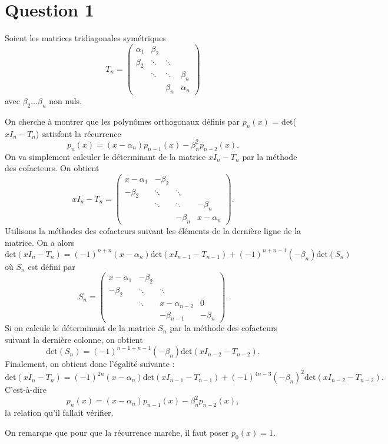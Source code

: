 \section*{Question 1}
Soient les matrices tridiagonales symétriques
$$T_n =
\begin{pmatrix}
\alpha_1 & \beta_2 & & \\
\beta_2 & \ddots & \ddots & \\
 & \ddots & \ddots & \beta_n \\
 & & \beta_n & \alpha_n
\end{pmatrix}
$$
avec $\beta_2 \hdots \beta_n$ non nuls.

On cherche à montrer que les polynômes orthogonaux définis par $p_n(x)$ = det($x I_n - T_n$) satisfont la récurrence $$p_n(x) = (x-\alpha_n)p_{n-1}(x) - \beta_n^2 p_{n-2}(x).$$
On va simplement calculer le déterminant de la matrice $x I_n - T_n$ par la méthode des cofacteurs. On obtient
$$x I_n - T_n =
\begin{pmatrix}
x-\alpha_1 & -\beta_2 & & \\
-\beta_2 & \ddots & \ddots & \\
 & \ddots & \ddots & -\beta_n \\
 & & -\beta_n & x-\alpha_n
\end{pmatrix}.
$$
Utilisons la méthodes des cofacteurs suivant les éléments de la dernière ligne de la matrice. On a alors $$\text{det}(x I_n - T_n) = (-1)^{n+n}(x-\alpha_n)\text{det}(x I_{n-1} - T_{n-1}) + (-1)^{n+n-1}(-\beta_n)\text{det}(S_n)$$ où $S_n$ est défini par
$$S_n =
\begin{pmatrix}
x-\alpha_1 & -\beta_2 & & \\
-\beta_2 & \ddots & \ddots & \\
 & \ddots & x-\alpha_{n-2} & 0 \\
 & & -\beta_{n-1} & -\beta_n
\end{pmatrix}.
$$
Si on calcule le déterminant de la matrice $S_n$ par la méthode des cofacteurs suivant la dernière colonne, on obtient $$\text{det}(S_n) = (-1)^{n-1+n-1}(-\beta_n)\text{det}(x I_{n-2} - T_{n-2}).$$
Finalement, on obtient donc l'égalité suivante : $$\text{det}(x I_n - T_n) = (-1)^{2n}(x-\alpha_n)\text{det}(x I_{n-1} - T_{n-1}) + (-1)^{4n-3}(-\beta_n)^2\text{det}(x I_{n-2} - T_{n-2}).$$
C'est-à-dire $$p_n(x) = (x-\alpha_n)p_{n-1}(x) - \beta_n^2 p_{n-2}(x),$$ la relation qu'il fallait vérifier.

On remarque que pour que la récurrence marche,
il faut poser $p_0(x) = 1$.
